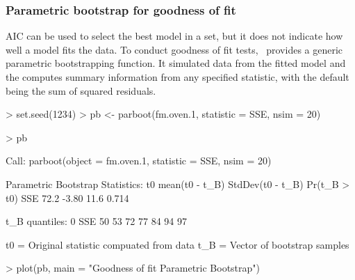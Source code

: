 \documentclass[article,shortnames]{jss}
\newcommand{\um}{\pkg{unmarked}}
\begin{document}
\subsubsection{Parametric bootstrap for goodness of fit}

AIC can be used to select the best model in a set, but it does not indicate how well a model fits the data.  To conduct goodness of fit tests, \um\ provides a generic parametric bootstrapping function.  It simulated data from the fitted model and the computes summary information from any specified statistic, with the default being the sum of squared residuals.

\begin{Schunk}
\begin{Sinput}
> set.seed(1234)
> pb <- parboot(fm.oven.1, statistic = SSE, nsim = 20)
\end{Sinput}
\end{Schunk}
\begin{Schunk}
\begin{Sinput}
> pb
\end{Sinput}
\begin{Soutput}
Call: parboot(object = fm.oven.1, statistic = SSE, nsim = 20)

Parametric Bootstrap Statistics:
      t0 mean(t0 - t_B) StdDev(t0 - t_B) Pr(t_B > t0)
SSE 72.2          -3.80             11.6        0.714

t_B quantiles:
    0%
SSE 50   53  72  77  84    94   97

t0 = Original statistic compuated from data
t_B = Vector of bootstrap samples
\end{Soutput}
\end{Schunk}

\begin{Schunk}
\begin{Sinput}
> plot(pb, main = "Goodness of fit Parametric Bootstrap")
\end{Sinput}
\end{Schunk}
\end{document}

